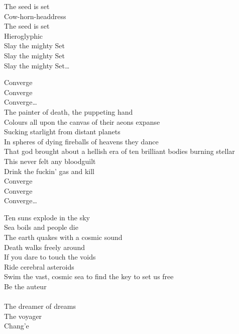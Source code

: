 The seed is set \\
Cow-horn-headdress \\
The seed is set \\
Hieroglyphic \\

Slay the mighty Set \\
Slay the mighty Set \\
Slay the mighty Set… \\


Converge \\
Converge \\
Converge… \\

The painter of death, the puppeting hand \\
Colours all upon the canvas of their aeons expanse \\
Sucking starlight from distant planets \\
In spheres of dying fireballs of heavens they dance \\

That god brought about a hellish era of ten brilliant bodies burning stellar \\
This  never felt any bloodguilt \\
Drink the fuckin' gas and kill \\

Converge \\
Converge \\
Converge… \\



Ten suns explode in the sky \\
Sea boils and people die \\
The earth quakes with a cosmic sound \\
Death walks freely around \\
If you dare to touch the voids \\
Ride cerebral asteroids \\
Swim the vast, cosmic sea to find the key to set us free \\

Be the auteur \\
 \\
The dreamer of dreams \\
The voyager \\
Chang'e \\

